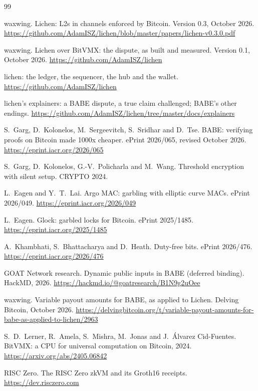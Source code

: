 \documentclass[11pt]{article}
\begin{document}
\begin{thebibliography}{99}

 waxwing. Lichen: L2s in channels enforced by Bitcoin. Version 0.3, October 2026. \url{https://github.com/AdamISZ/lichen/blob/master/papers/lichen-v0.3.0.pdf}

 waxwing. Lichen over BitVMX: the dispute, as built and measured. Version 0.1, October 2026. \url{https://github.com/AdamISZ/lichen}

 lichen: the ledger, the sequencer, the hub and the wallet. \url{https://github.com/AdamISZ/lichen}

 lichen's explainers: a BABE dispute, a true claim challenged; BABE's other endings. \url{https://github.com/AdamISZ/lichen/tree/master/docs/explainers}

 S.~Garg, D.~Kolonelos, M.~Sergeevitch, S.~Sridhar and D.~Tse. BABE: verifying proofs on Bitcoin made 1000x cheaper. ePrint 2026/065, revised October 2026. \url{https://eprint.iacr.org/2026/065}

 S.~Garg, D.~Kolonelos, G.-V.~Policharla and M.~Wang. Threshold encryption with silent setup. CRYPTO 2024.

 L.~Eagen and Y.~T.~Lai. Argo MAC: garbling with elliptic curve MACs. ePrint 2026/049. \url{https://eprint.iacr.org/2026/049}

 L.~Eagen. Glock: garbled locks for Bitcoin. ePrint 2025/1485. \url{https://eprint.iacr.org/2025/1485}

 A.~Khambhati, S.~Bhattacharya and D.~Heath. Duty-free bits. ePrint 2026/476. \url{https://eprint.iacr.org/2026/476}

 GOAT Network research. Dynamic public inputs in BABE (deferred binding). HackMD, 2026. \url{https://hackmd.io/@goatresearch/B1N9g2uOee}

 waxwing. Variable payout amounts for BABE, as applied to Lichen. Delving Bitcoin, October 2026. \url{https://delvingbitcoin.org/t/variable-payout-amounts-for-babe-as-applied-to-lichen/2963}

 S.~D.~Lerner, R.~Amela, S.~Mishra, M.~Jonas and J.~\'Alvarez Cid-Fuentes. BitVMX: a CPU for universal computation on Bitcoin, 2024. \url{https://arxiv.org/abs/2405.06842}

 RISC Zero. The RISC Zero zkVM and its Groth16 receipts. \url{https://dev.risczero.com}

\end{thebibliography}
\end{document}

